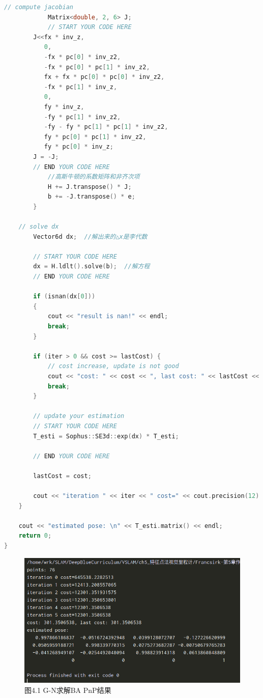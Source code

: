 \documentclass[40pt,a4paper，UTF8]{ctexart}
\numberwithin{equation}{section}
\begin{document}
\begin{lstlisting}[language=C++, caption=CMakeLists.txt]
	    // compute jacobian
            Matrix<double, 2, 6> J;
            // START YOUR CODE HERE
        J<<fx * inv_z,
           0,
           -fx * pc[0] * inv_z2,
           -fx * pc[0] * pc[1] * inv_z2,
           fx + fx * pc[0] * pc[0] * inv_z2,
           -fx * pc[1] * inv_z,
           0,
           fy * inv_z,
           -fy * pc[1] * inv_z2,
           -fy - fy * pc[1] * pc[1] * inv_z2,
           fy * pc[0] * pc[1] * inv_z2,
           fy * pc[0] * inv_z;
        J = -J;
	    // END YOUR CODE HERE
            //高斯牛顿的系数矩阵和非齐次项
            H += J.transpose() * J;
            b += -J.transpose() * e;
        }

	// solve dx
        Vector6d dx;  //解出来的△x是李代数

        // START YOUR CODE HERE
        dx = H.ldlt().solve(b);  //解方程
        // END YOUR CODE HERE

        if (isnan(dx[0]))
        {
            cout << "result is nan!" << endl;
            break;
        }

        if (iter > 0 && cost >= lastCost) {
            // cost increase, update is not good
            cout << "cost: " << cost << ", last cost: " << lastCost << endl;
            break;
        }

        // update your estimation
        // START YOUR CODE HERE
        T_esti = Sophus::SE3d::exp(dx) * T_esti;

        // END YOUR CODE HERE

        lastCost = cost;

        cout << "iteration " << iter << " cost=" << cout.precision(12) << cost << endl;
    }

    cout << "estimated pose: \n" << T_esti.matrix() << endl;
    return 0;
}
\end{lstlisting}

\begin{figure}[H]
\centering
\includegraphics[scale=0.5]{ch5_4_1.png} {\\图4.1 G-N求解BA PnP结果}
\end{figure}
\end{document}
